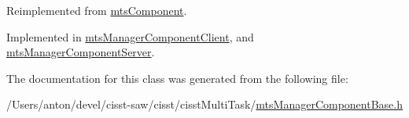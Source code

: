 Reimplemented from \hyperlink{classmts_component_aaf28f0262b44eb6866e10089a02fa6e4}{mts\+Component}.



Implemented in \hyperlink{classmts_manager_component_client_a24261b416cd8c9389842d6a29ddb4cc7}{mts\+Manager\+Component\+Client}, and \hyperlink{classmts_manager_component_server_ab4a7ff516bbe04b439039a2342e48455}{mts\+Manager\+Component\+Server}.



The documentation for this class was generated from the following file\+:\begin{DoxyCompactItemize}
\item 
/\+Users/anton/devel/cisst-\/saw/cisst/cisst\+Multi\+Task/\hyperlink{mts_manager_component_base_8h}{mts\+Manager\+Component\+Base.\+h}\end{DoxyCompactItemize}
